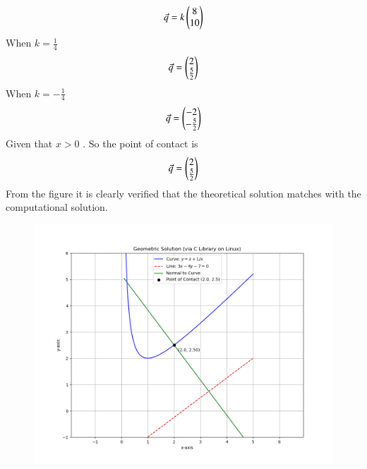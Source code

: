 \documentclass[journal]{IEEEtran}
\theoremstyle{remark}
\begin{document}
\begin{align}
    \Vec{q}=k\begin{pmatrix}8\\10\end{pmatrix}
\end{align}
When $k=\frac{1}{4}$
\begin{align}
    \Vec{q}=\begin{pmatrix}2\\\frac{5}{2}\end{pmatrix}
\end{align}
When $k=-\frac{1}{4}$
\begin{align}
    \Vec{q}=\begin{pmatrix}-2\\-\frac{5}{2}\end{pmatrix}
\end{align}
Given that $x>0$ . So the point of contact is 
\begin{align}
     \Vec{q}=\begin{pmatrix}2\\\frac{5}{2}\end{pmatrix}
\end{align}
From the figure it is clearly verified that the theoretical solution matches with the computational solution.\\
\begin{figure}[h]
    \centering
    \includegraphics[height=0.5\textheight, keepaspectratio]{figs/figure1.png}
    \label{figure_1}
\end{figure}
\end{document}
